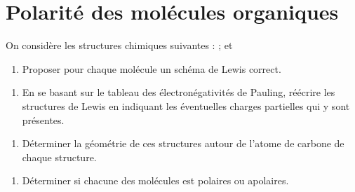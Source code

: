 \documentclass[a4paper,fontsize=10pt,fleqn]{scrartcl}%
\begin{document}
\maketitle

\section{Polarité des molécules organiques}

On considère les structures chimiques suivantes :  ;  et 
\begin{enumerate}
    \item Proposer pour chaque molécule un schéma de Lewis correct.
\end{enumerate}
\noindent \fbox{\begin{minipage}{\linewidth}
    \vspace{20cm} \hspace{\linewidth}
\end{minipage}}

\begin{enumerate}[resume]
    \item En se basant sur le tableau des électronégativités de Pauling, réécrire les structures de Lewis en indiquant les éventuelles charges partielles qui y sont présentes.
\end{enumerate}
\noindent \fbox{\begin{minipage}{\linewidth}
    \vspace{15em} \hspace{\linewidth}
\end{minipage}}

\begin{enumerate}[resume]
    \item Déterminer la géométrie de ces structures autour de l'atome de carbone de chaque structure.
\end{enumerate}
\noindent \fbox{\begin{minipage}{\linewidth}
    \vspace{17em} \hspace{\linewidth}
\end{minipage}}

\begin{enumerate}[resume]
    \item Déterminer si chacune des molécules est polaires ou apolaires.
\end{enumerate}
\noindent \fbox{\begin{minipage}{\linewidth}
    \vspace{10em} \hspace{\linewidth}
\end{minipage}}
\end{document}
